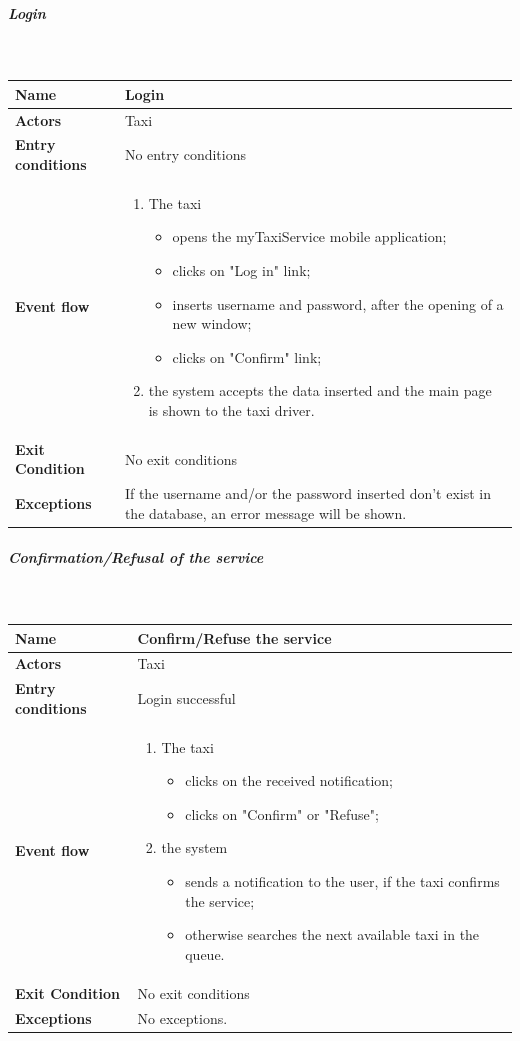 \subparagraph{Login}
~\\[0.2cm]
\vspace{20pt}
\noindent
\begin{tabular}{l l}
 \textbf {Name} & Login  \\ \hline
 \textbf{Actors} & Taxi \\ \hline
 \textbf{Entry conditions} & No entry conditions \\ \hline
 \textbf{Event flow} & 
 \parbox{0.7\textwidth}{
 \begin{enumerate}
 \item The taxi
    \begin{itemize}
    \item opens the myTaxiService mobile application;
    \item clicks on "Log in" link;
    \item inserts username and password, after the opening of a new window;
    \item clicks on "Confirm" link;
    \end{itemize}
 \item the system accepts the data inserted and the main page is shown to the taxi driver.
 \end{enumerate}
 } \\ \hline
 \textbf{Exit Condition} & No exit conditions \\ \hline
 \textbf{Exceptions} & \parbox{0.7\textwidth}{If the username and/or the password inserted don't exist in the database, an error message will be shown.}
\end{tabular}
\newpage
\subparagraph{Confirmation/Refusal of the service}
~\\[0.2cm]
\vspace{20pt}
\noindent
\begin{tabular}{l l}
 \textbf {Name} & Confirm/Refuse the service  \\ \hline
 \textbf{Actors} & Taxi \\ \hline
 \textbf{Entry conditions} & Login successful \\ \hline
 \textbf{Event flow} & 
 \parbox{0.7\textwidth}{
 \begin{enumerate}
 \item The taxi
 \begin{itemize}
 \item clicks on the received notification;
 \item clicks on "Confirm" or "Refuse";
 \end{itemize}
 \item the system
  \begin{itemize}
 \item sends a notification to the user, if the taxi confirms the service;
 \item otherwise searches the next available taxi in the queue.
 \end{itemize}
 \end{enumerate}
 } \\ \hline
 \textbf{Exit Condition} & No exit conditions \\ \hline
 \textbf{Exceptions} & No exceptions.
\end{tabular}

